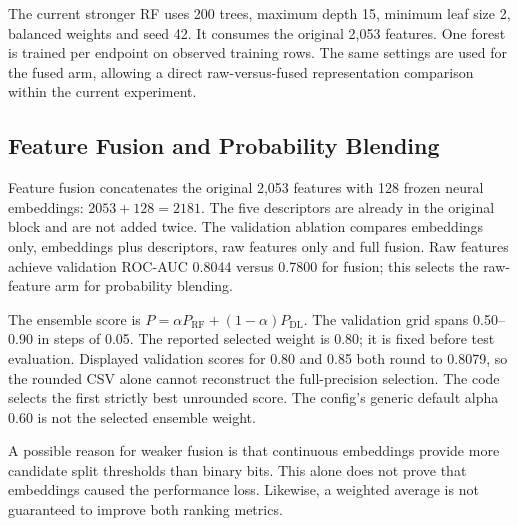\documentclass[conference]{IEEEtran}
\begin{document}
The current stronger RF uses 200 trees, maximum depth 15, minimum leaf size 2, balanced weights and seed 42. It consumes the original 2,053 features. One forest is trained per endpoint on observed training rows. The same settings are used for the fused arm, allowing a direct raw-versus-fused representation comparison within the current experiment.

\subsection{Feature Fusion and Probability Blending}
Feature fusion concatenates the original 2,053 features with 128 frozen neural embeddings: $2053+128=2181$. The five descriptors are already in the original block and are not added twice. The validation ablation compares embeddings only, embeddings plus descriptors, raw features only and full fusion. Raw features achieve validation ROC-AUC 0.8044 versus 0.7800 for fusion; this selects the raw-feature arm for probability blending.

The ensemble score is $P=\alpha P_{\mathrm{RF}}+(1-\alpha)P_{\mathrm{DL}}$. The validation grid spans 0.50--0.90 in steps of 0.05. The reported selected weight is 0.80; it is fixed before test evaluation. Displayed validation scores for 0.80 and 0.85 both round to 0.8079, so the rounded CSV alone cannot reconstruct the full-precision selection. The code selects the first strictly best unrounded score. The config's generic default alpha 0.60 is not the selected ensemble weight.

A possible reason for weaker fusion is that continuous embeddings provide more candidate split thresholds than binary bits. This alone does not prove that embeddings caused the performance loss. Likewise, a weighted average is not guaranteed to improve both ranking metrics.
\end{document}
